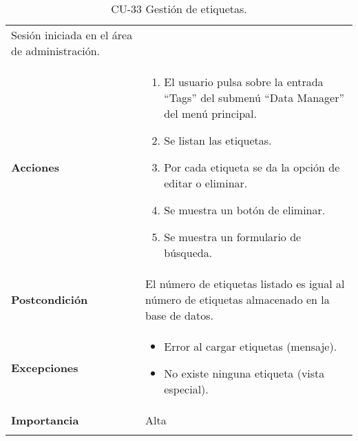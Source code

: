 \begin{longtable}[]{@{}ll@{}}
\begin{minipage}[t]{0.74\columnwidth}
Sesión iniciada en el área de administración.\strut
\end{minipage}\tabularnewline
\begin{minipage}[t]{0.20\columnwidth}\raggedright
\textbf{Acciones}\strut
\end{minipage} & \begin{minipage}[t]{0.74\columnwidth}\raggedright
\begin{enumerate}
\def\labelenumi{\arabic{enumi}.}
\tightlist
\item
  El usuario pulsa sobre la entrada ``Tags'' del submenú ``Data Manager''
  del menú principal.
\item
  Se listan las etiquetas.
\item
  Por cada etiqueta se da la opción de editar o eliminar.
\item
  Se muestra un botón de eliminar.
\item
  Se muestra un formulario de búsqueda.
\end{enumerate}\strut
\end{minipage}\tabularnewline
\begin{minipage}[t]{0.20\columnwidth}\raggedright
\textbf{Postcondición}\strut
\end{minipage} & \begin{minipage}[t]{0.74\columnwidth}\raggedright
El número de etiquetas listado es igual al número de etiquetas
almacenado en la base de datos.\strut
\end{minipage}\tabularnewline
\begin{minipage}[t]{0.20\columnwidth}\raggedright
\textbf{Excepciones}\strut
\end{minipage} & \begin{minipage}[t]{0.74\columnwidth}\raggedright
\begin{itemize}
\tightlist
\item
  Error al cargar etiquetas (mensaje).
\item
  No existe ninguna etiqueta (vista especial).
\end{itemize}\strut
\end{minipage}\tabularnewline
\begin{minipage}[t]{0.20\columnwidth}\raggedright
\textbf{Importancia}\strut
\end{minipage} & \begin{minipage}[t]{0.74\columnwidth}\raggedright
Alta\strut
\end{minipage}\tabularnewline
\bottomrule
\caption{CU-33 Gestión de etiquetas.}
\end{longtable}

